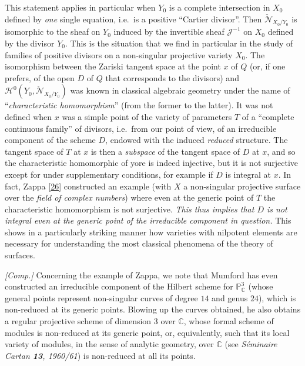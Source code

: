 \documentclass{article}
\newcommand{\oldpage}[1]{\marginpar{\footnotesize$\Big\vert$ \textit{p.~#1}}}
\theoremstyle{definition}
\theoremstyle{definition}
\theoremstyle{definition}
\theoremstyle{definition}
\theoremstyle{remark}
\begin{document}
\leavevmode{}%
This statement applies in particular when \(Y_0\) is a complete intersection in \(X_0\) defined by \emph{one} single equation, i.e.~is a positive ``Cartier divisor''.
Then \(\check{{\mathscr{N}}}_{X_0/Y_0}\) is isomorphic to the sheaf on \(Y_0\) induced by the invertible sheaf \({\mathscr{J}}^{-1}\) on \(X_0\) defined by the divisor \(Y_0\).
This is the situation that we find in particular in the study of families of positive divisors on a non-singular projective variety \(X_0\).
The isomorphism between the Zariski tangent space at the point \(x\) of \(Q\) (or, if one prefers, of the open \(D\) of \(Q\) that corresponds to the divisors) and \({\mathscr{H}}^0(Y_0,\check{{\mathscr{N}}}_{X_0/Y_0})\) was known in classical algebraic geometry under the name of ``\emph{characteristic homomorphism}'' (from the former to the latter).
It was not defined when \(x\) was a simple point of the variety of parameters \(T\) of a ``complete continuous family'' of divisors, i.e.~from our point of view, of an irreducible component of the scheme \(D\), endowed with the induced \emph{reduced} structure.
The tangent space of \(T\) at \(x\) is then a \emph{subspace} of the tangent space of \(D\) at \(x\), and so the characteristic homomorphic of yore is indeed injective, but it is not surjective except for under supplementary conditions, for example if \(D\) is integral at \(x\).
\oldpage{221-24}In fact, Zappa {[}\protect\hyperlink{ref-Zap1945}{26}{]} constructed an example (with \(X\) a non-singular projective surface over the \emph{field of complex numbers}) where even at the generic point of \(T\) the characteristic homomorphism is not surjective.
\emph{This thus implies that \(D\) is not integral even at the generic point of the irreducible component in question.}
This shows in a particularly striking manner how varieties with nilpotent elements are necessary for understanding the most classical phenomena of the theory of surfaces.

\emph{{[}Comp.{]}}
Concerning the example of Zappa, we note that Mumford has even constructed an irreducible component of the Hilbert scheme for \(\mathbb{P}_\mathbb{C}^3\) (whose general points represent non-singular curves of degree \(14\) and genus \(24\)), which is non-reduced at its generic points.
Blowing up the curves obtained, he also obtains a regular projective scheme of dimension \(3\) over \(\mathbb{C}\), whose formal scheme of modules is non-reduced at its generic point, or, equivalently, such that its local variety of modules, in the sense of analytic geometry, over \(\mathbb{C}\) (see \emph{Séminaire Cartan \textbf{13}, 1960/61}) is non-reduced at all its points.
\end{document}
